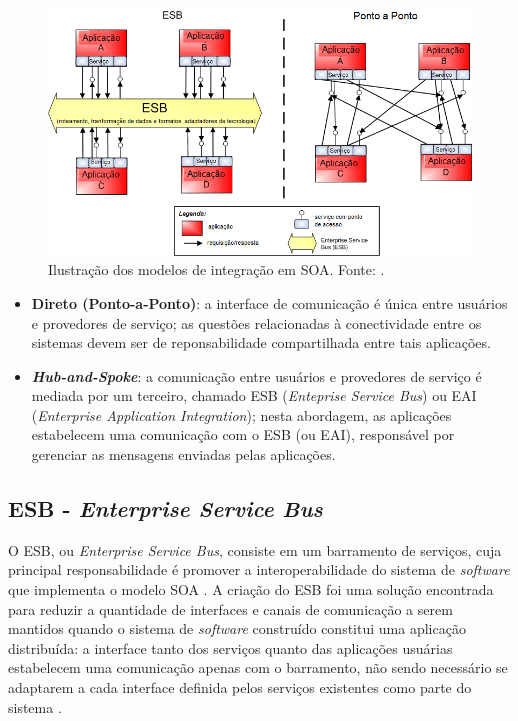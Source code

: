 \begin{figure}[htb]
\centering
\includegraphics[scale=0.7]{figuras/modelos_integracao_soa.png}
\caption{Ilustração dos modelos de integração em SOA. Fonte: \cite{Bianco2007}.}
\label{modelos_integracao_soa}
\end{figure}

\begin{itemize}
\item \textbf{Direto (Ponto-a-Ponto)}: a interface de comunicação é única entre usuários e provedores de serviço; as questões relacionadas à conectividade entre os sistemas devem ser de reponsabilidade compartilhada entre tais aplicações.
\item \textbf{\textit{Hub-and-Spoke}}: a comunicação entre usuários e provedores de serviço é mediada por um terceiro, chamado ESB (\textit{Enteprise Service Bus}) ou EAI (\textit{Enterprise Application Integration}); nesta abordagem, as aplicações estabelecem uma comunicação com o ESB (ou EAI), responsável por gerenciar as mensagens enviadas pelas aplicações.
\end{itemize}

\subsection{ESB - \textit{Enterprise Service Bus}}

O ESB, ou \textit{Enterprise Service Bus}, consiste em um barramento de serviços, cuja principal responsabilidade é promover a interoperabilidade do sistema de \textit{software} que implementa o modelo SOA \cite{josuttis_soa_2007}. A criação do ESB foi uma solução encontrada para reduzir a quantidade de interfaces e canais de comunicação a serem mantidos quando o sistema de \textit{software} construído constitui uma aplicação distribuída: a interface tanto dos serviços quanto das aplicações usuárias estabelecem uma comunicação apenas com o barramento, não sendo necessário se adaptarem a cada interface definida pelos serviços existentes como parte do sistema \cite{josuttis_soa_2007}.

